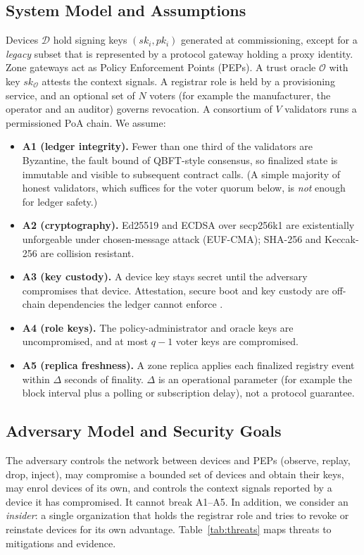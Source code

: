 \subsection{System Model and Assumptions}\label{sec:sysmodel}
Devices $\mathcal{D}$ hold signing keys $(sk_i,pk_i)$ generated at commissioning, except for a \emph{legacy} subset that is represented by a protocol gateway holding a proxy identity. Zone gateways act as Policy Enforcement Points (PEPs). A trust oracle $\mathcal{O}$ with key $sk_\mathcal{O}$ attests the context signals. A registrar role is held by a provisioning service, and an optional set of $N$ voters (for example the manufacturer, the operator and an auditor) governs revocation. A consortium of $V$ validators runs a permissioned PoA chain. We assume:
\begin{itemize}[leftmargin=1.1em,itemsep=0pt,topsep=1pt]
  \item \textbf{A1 (ledger integrity).} Fewer than one third of the validators are Byzantine, the fault bound of QBFT-style consensus, so finalized state is immutable and visible to subsequent contract calls. (A simple majority of honest validators, which suffices for the voter quorum below, is \emph{not} enough for ledger safety.)
  \item \textbf{A2 (cryptography).} Ed25519 and ECDSA over secp256k1 are existentially unforgeable under chosen-message attack (EUF-CMA); SHA-256 and Keccak-256 are collision resistant.
  \item \textbf{A3 (key custody).} A device key stays secret until the adversary compromises that device. Attestation, secure boot and key custody are off-chain dependencies the ledger cannot enforce \cite{shujaa2025enhancing}.
  \item \textbf{A4 (role keys).} The policy-administrator and oracle keys are uncompromised, and at most $q-1$ voter keys are compromised.
  \item \textbf{A5 (replica freshness).} A zone replica applies each finalized registry event within $\Delta$ seconds of finality. $\Delta$ is an operational parameter (for example the block interval plus a polling or subscription delay), not a protocol guarantee.
\end{itemize}

\subsection{Adversary Model and Security Goals}\label{sec:adversary}
The adversary controls the network between devices and PEPs (observe, replay, drop, inject), may compromise a bounded set of devices and obtain their keys, may enrol devices of its own, and controls the context signals reported by a device it has compromised. It cannot break A1--A5. In addition, we consider an \emph{insider}: a single organization that holds the registrar role and tries to revoke or reinstate devices for its own advantage. Table~\ref{tab:threats} maps threats to mitigations and evidence.

